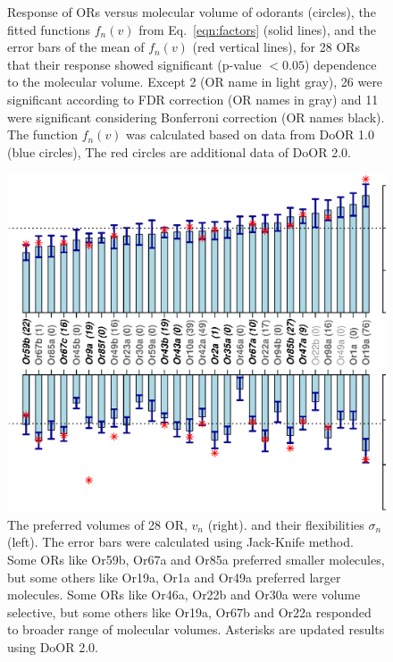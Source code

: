 \documentclass[11pt]{paper} %
\newcommand{\numberofreceptors}{ 28 }
\newcommand{\bonferroni}{ 11 }
\newcommand{\fdr}{ 26 }
\newcommand{\nocorrection}{ 2 }
\begin{document}
\begin{figure}
	\caption{Response of ORs  versus molecular volume of odorants (circles),  
			the fitted functions $f_n(v)$ from Eq.~\ref{eqn:factors} (solid lines), 
			and the error bars of the mean of $f_n(v)$ (red vertical lines), 
			for \numberofreceptors ORs that their response showed significant (p-value $<0.05$) dependence to the molecular volume. 
			Except \nocorrection (OR name in light gray), \fdr were significant according to FDR correction (OR names in gray) and 
			\bonferroni were significant considering Bonferroni correction (OR names black).
			The function $f_n(v)$ was calculated based on data from DoOR 1.0 (blue circles), 
			The red circles are additional data of DoOR 2.0. 
		}
	\label{fig:vol-res}
\end{figure}

\begin{figure}
		\centering
		\includegraphics[height= 1  \textwidth , angle=-90]{mean-std-vol-}

	\caption{The preferred volumes of \numberofreceptors OR, $v_n$ (right). 
		and their flexibilities $\sigma_n$ (left). 
		The error bars were calculated using Jack-Knife method. 
		Some ORs like Or59b, Or67a and  Or85a preferred smaller molecules, 
		but some others like Or19a,  Or1a and  Or49a preferred larger molecules.
		Some ORs like Or46a,  Or22b and Or30a were volume  selective, 
		but some others like Or19a,  Or67b and  Or22a responded to broader range of molecular volumes.
		Asterisks are updated results using DoOR 2.0.
		}
		\label{fig:preferred_volume}
\end{figure}
\end{document}
